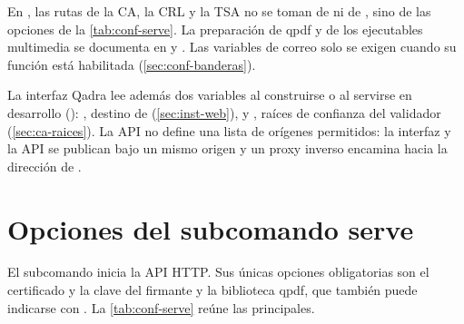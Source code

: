 En , las rutas de la CA, la CRL y la TSA no se toman de
 ni de , sino de las opciones de la
\cref{tab:conf-serve}. La preparación de qpdf y de los ejecutables multimedia
se documenta en  y
. Las variables de correo solo se exigen
cuando su función está habilitada (\cref{sec:conf-banderas}).

La interfaz Qadra lee además dos variables al construirse o al servirse en
desarrollo ():
, destino de  (\cref{sec:inst-web}),
y , raíces de confianza del validador
(\cref{sec:ca-raices}). La API no define una lista de orígenes permitidos: la
interfaz y la API se publican bajo un mismo origen y un proxy inverso encamina
 hacia la dirección de .

\section{Opciones del subcomando serve}\label{sec:conf-serve}

El subcomando  inicia la API HTTP. Sus únicas opciones
obligatorias son el certificado y la clave del firmante y la biblioteca qpdf,
que también puede indicarse con . La
\cref{tab:conf-serve} reúne las principales.


